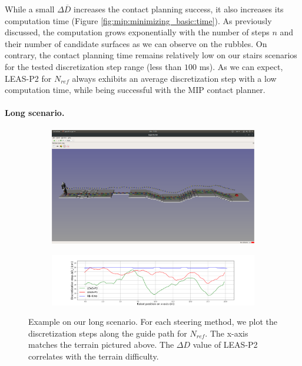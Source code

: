 While a small $\Delta \overline{D}$ increases the contact planning success, it also increases its computation time (Figure \ref{fig:mip:minimizing_basic:time}). As previously discussed, the computation grows exponentially with the number of steps $n$ and their number of candidate surfaces as we can observe on the rubbles.
On contrary, the contact planning time remains relatively low on our stairs scenarios for the tested discretization step range (less than $100$ ms). 
As we can expect, LEAS-P2 for $N_{ref}$ always exhibits an average discretization step with a low computation time, while being successful with the MIP contact planner.


\paragraph{Long scenario.}
\begin{figure}[ht]
    \captionsetup[subfigure]{justification=centering}
    \centering
    \begin{subfigure}[t]{0.9\linewidth}
        \includegraphics[trim={1cm 12cm 1cm 15cm}, clip,width=\textwidth]{Figures/Chapter_MIP_SL1M/1x11_guide_all_surf_steps.png}
    \end{subfigure}
    \begin{subfigure}[t]{0.9\linewidth}
        \includegraphics[trim={4cm 0cm 3.5cm 1.5cm}, clip,width=\textwidth]{Figures/Chapter_MIP_SL1M/res_mip/long_discr_x.png}
    \end{subfigure}
    \caption{Example on our long scenario. For each steering method, we plot the discretization steps along the guide path for $N_{ref}$. The x-axis matches the terrain pictured above. The $\Delta D$ value of LEAS-P2 correlates with the terrain difficulty.}
    \label{fig:mip:long_range}
\end{figure}

